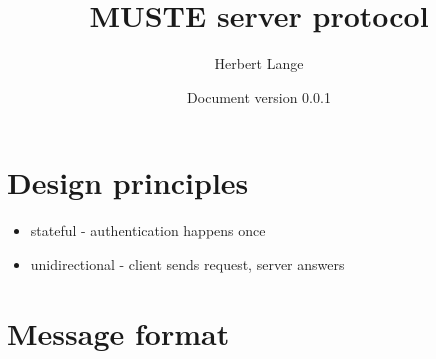 \documentclass{scrartcl}
\title{MUSTE server protocol}
\author{Herbert Lange}
\date{Document version 0.0.1}
\begin{document}
\maketitle

\section{Design principles}

\begin{itemize}
\item stateful - authentication happens once
\item unidirectional - client sends request, server answers
\end{itemize}

\section{Message format}
\end{document}
